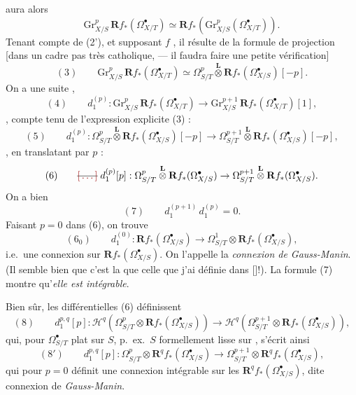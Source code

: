 \documentclass[11pt,a4paper]{article}
\begin{document}
aura alors
\[
\mathrm{Gr}^{p}_{X/S}\, \mathbf{R}f_{*}(\Omega^{\bullet}_{X/T}) \simeq \mathbf{R}f_{*}(\mathrm{Gr}^{p}_{X/S}(\Omega^{\bullet}_{X/T})) .
\]
Tenant compte de (2'), et supposant $f$   , il résulte  de la formule de projection [dans un cadre pas très catholique, --- il faudra faire une petite vérification]
\[
(3) \qquad \mathrm{Gr}^{p}_{X/S}\, \mathbf{R}f_{*}(\Omega^{\bullet}_{X/T}) \simeq \Omega^{p}_{S/T} \overset{\mathbf{L}}{\otimes} \mathbf{R}f_{*}(\Omega^{\bullet}_{X/S})[-p] .
\]
On a  une suite ,  \ill{}
\[
(4) \qquad d^{(p)}_{1} : \mathrm{Gr}^{p}_{X/S}\, \mathbf{R}f_{*}(\Omega^{\bullet}_{X/T}) \to \mathrm{Gr}^{p+1}_{X/S}\, \mathbf{R}f_{*}(\Omega^{\bullet}_{X/T})[1] ,
\]
 , compte tenu de l'expression explicite (3) :
\[
(5) \qquad d^{(p)}_{1} : \Omega^{p}_{S/T} \overset{\mathbf{L}}{\otimes} \mathbf{R}f_{*}(\Omega^{\bullet}_{X/S})[-p] \to \Omega^{p+1}_{S/T} \overset{\mathbf{L}}{\otimes} \mathbf{R}f_{*}(\Omega^{\bullet}_{X/S})[-p] ,
\]
, en translatant par $p$ :
\[
(6) \qquad \text{\struck{$\ill{}$}}\; d^{(p)}_{1}[p] : \Omega^{p}_{S/T} \overset{\mathbf{L}}{\otimes} \mathbf{R}f_{*}(\Omega^{\bullet}_{X/S}) \to \Omega^{p+1}_{S/T} \overset{\mathbf{L}}{\otimes} \mathbf{R}f_{*}(\Omega^{\bullet}_{X/S}) .
\]
On a bien 
\[
(7) \qquad d^{(p+1)}_{1}\, d^{(p)}_{1} = 0 .
\]
Faisant $p = 0$ dans (6), on trouve
\[
(6_{0}) \qquad d^{(0)}_{1} : \mathbf{R}f_{*}(\Omega^{\bullet}_{X/S}) \to \Omega^{1}_{S/T} \otimes \mathbf{R}f_{*}(\Omega^{\bullet}_{X/S}) ,
\]
i.e.\ une connexion sur $\mathbf{R}f_{*}(\Omega^{\bullet}_{X/S})$. On l'appelle la \emph{connexion de Gauss-Manin}.  (Il semble bien que c'est la  que celle que j'ai définie dans \ill{} [\ill{}]!).
La formule (7) montre qu'\emph{elle est intégrable}.

 Bien sûr, les différentielles (6) définissent
\[
(8) \qquad d^{p,q}_{1}[p] : \mathcal{H}^{q}(\Omega^{p}_{S/T} \otimes \mathbf{R}f_{*}(\Omega^{\bullet}_{X/S})) \to \mathcal{H}^{q}(\Omega^{p+1}_{S/T} \otimes \mathbf{R}f_{*}(\Omega^{\bullet}_{X/S})) ,
\]
qui, pour $\Omega^{\bullet}_{S/T}$ plat sur $S$, p.\ ex.\ $S$ formellement lisse sur , \struck{\ill{}} s'écrit ainsi
\[
(8') \qquad d^{p,q}_{1}[p] : \Omega^{p}_{S/T} \otimes \mathbf{R}^{q}f_{*}(\Omega^{\bullet}_{X/S}) \to \Omega^{p+1}_{S/T} \otimes \mathbf{R}^{q}f_{*}(\Omega^{\bullet}_{X/S}) ,
\]
qui pour $p = 0$ définit une connexion intégrable sur les $\mathbf{R}^{q}f_{*}(\Omega^{\bullet}_{X/S})$, dite connexion de \emph{Gauss-Manin}.
\end{document}
